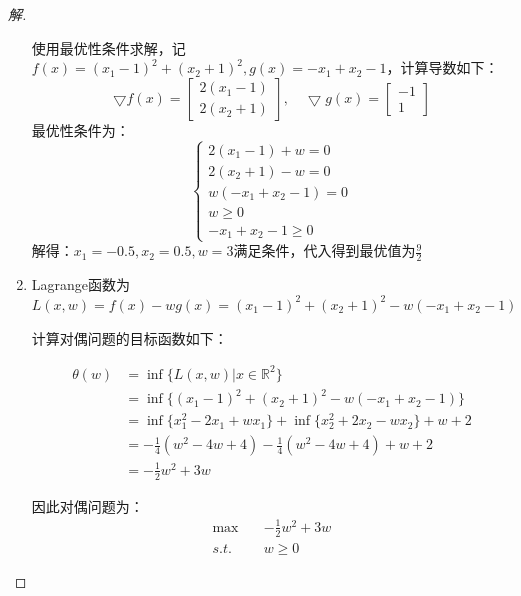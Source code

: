 \documentclass[a4paper]{article}
\begin{document}
\begin{proof}[解]
\begin{enumerate}
	使用最优性条件求解，记$f(x)=(x_1-1)^2+(x_2+1)^2,g(x)=-x_1+x_2-1$，计算导数如下：
	\begin{equation}
	\bigtriangledown f(x)=\left[
	\begin{array}{c}
	2(x_1-1) \\
	2(x_2+1)
	\end{array}
	\right],\quad\bigtriangledown g(x)=\left[
	\begin{array}{c}
	-1 \\
	1
	\end{array}
	\right]
	\end{equation}
    最优性条件为：
    \begin{equation}
    \left\{
    \begin{array}{c}
    2(x_1-1)+w=0 \\
    2(x_2+1)-w=0 \\
    w(-x_1+x_2-1)=0 \\
    w \ge 0 \\
    -x_1+x_2-1 \ge 0
    \end{array}
    \right.
    \end{equation}
    解得：$x_1=-0.5,x_2=0.5,w=3$满足条件，代入得到最优值为$\frac{9}{2}$
    \item Lagrange函数为$L(x,w)=f(x)-wg(x)=(x_1-1)^2+(x_2+1)^2-w(-x_1+x_2-1)$
    
    计算对偶问题的目标函数如下：
    
    \begin{equation}
    \begin{aligned}
    \theta(w)&=\inf \{L(x,w)|x\in \mathbb{R}^2\} \\
    &=\inf\{(x_1-1)^2+(x_2+1)^2-w(-x_1+x_2-1)\} \\
    &=\inf\{x_1^2-2x_1+wx_1\}+\inf\{x_2^2+2x_2-wx_2\}+w+2 \\
    &=-\frac{1}{4}(w^2-4w+4)-\frac{1}{4}(w^2-4w+4)+w+2 \\
    &=-\frac{1}{2}w^2+3w
    \end{aligned}
    \end{equation}
    
    因此对偶问题为：
    \begin{equation}
    \begin{aligned}
    \max\quad &-\frac{1}{2}w^2+3w \\
    s.t.\quad &w\ge0
    \end{aligned}
    \end{equation}
\end{enumerate}
\end{proof}
\end{document}
